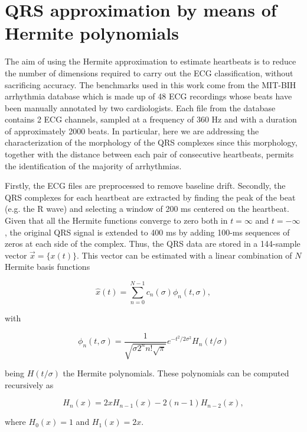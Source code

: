 \documentclass[runningheads]{llncs}
\begin{document}
\section{QRS approximation by means of Hermite polynomials}\label{s:arr}

The aim of using the Hermite approximation to estimate heartbeats is to 
reduce the number of dimensions required to carry out the ECG classification, 
without sacrificing accuracy. 
The benchmarks used in this work come from the MIT-BIH arrhythmia database \cite{j:moody01} which is made up of 
48 ECG recordings whose beats  have been manually annotated by two cardiologists. Each file from the database 
contains 2 ECG channels, sampled at a frequency of 360 Hz and with a duration of approximately 2000 beats. 
In particular, here we are addressing the characterization of the morphology of the QRS complexes since this 
morphology, together with the distance between each pair of consecutive heartbeats, permits the identification of the majority of arrhythmias.

Firstly,  the ECG files are preprocessed to remove baseline drift. Secondly, the QRS complexes for each heartbeat are extracted by finding the peak of the beat (e.g. the R wave) and selecting a  window of 200 ms centered on the heartbeat. Given that all the Hermite functions converge to zero both in $t=\infty$ and $t=-\infty$, the original QRS signal is extended to 400 ms by adding 100-ms sequences of zeros at each side of the complex. Thus, the QRS data are stored in a 144-sample vector $\vec{x}=\{x(t)\}$. This vector can be estimated with a linear combination of $N$ Hermite basis functions

\begin{equation}\label{eqn:hat}
\hat{x}(t)=\sum_{n=0}^{N-1}c_n(\sigma )\phi_n(t,\sigma),
\end{equation}

\noindent with

\begin{equation}\label{eqn:phi}
\phi_n(t,\sigma )=\frac{1}{\sqrt{\sigma 2^n n!\sqrt{\pi}}}e^{-t^2/2\sigma^2}H_n(t/\sigma) 
\end{equation}

\noindent being $H(t/\sigma)$ the Hermite polynomials. These polynomials can be computed recursively as

\begin{equation}
H_n(x)=2xH_{n-1}(x)-2(n-1)H_{n-2}(x),
\end{equation}

\noindent where $H_0(x)=1$ and $H_1(x)=2x$.
\end{document}
